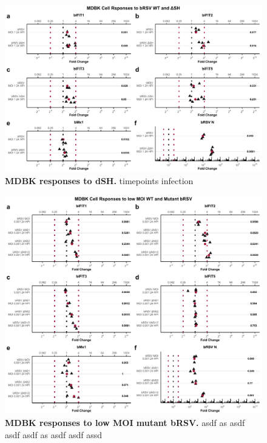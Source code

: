 \begin{figure}
    \centering
    \includegraphics[width=1\linewidth]{07. Chapter 2/Figs/02. Induction/05. mdbk_brsv_moi1_dsh.pdf}
    \caption[MDBK responses to dSH.]{\textbf{MDBK responses to dSH.} timepoints infection }
    \label{MDBK responses to dSH}
\end{figure}

\begin{figure}
    \centering
    \includegraphics[width=1\linewidth]{07. Chapter 2/Figs/02. Induction/06. mdbk_brsv_low_moi.pdf}
    \caption[MDBK responses to low MOI mutant bRSV.]{\textbf{MDBK responses to low MOI mutant bRSV.} asdf as asdf asdf asdf as asdf asdf assd }
    \label{MDBK responses to low MOI mutant bRSV}
\end{figure}

